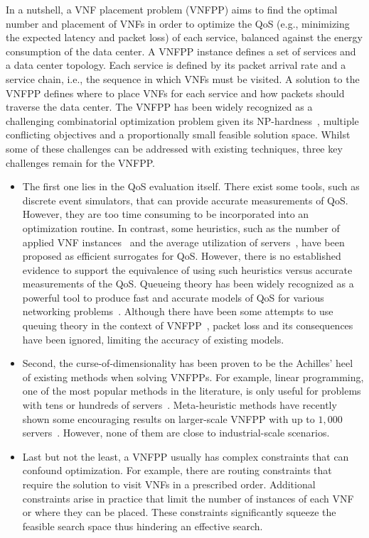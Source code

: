 In a nutshell, a VNF placement problem (VNFPP) aims to find the optimal number and placement of VNFs in order to optimize the QoS (e.g., minimizing the expected latency and packet loss) of each service, balanced against the energy consumption of the data center. A VNFPP instance defines a set of services and a data center topology. Each service is defined by its packet arrival rate and a service chain, i.e., the sequence in which VNFs must be visited. A solution to the VNFPP defines where to place VNFs for each service and how packets should traverse the data center. The VNFPP has been widely recognized as a challenging combinatorial optimization problem given its NP-hardness~\cite{LuizelliCBG17,SangJGDY17,CohenLNR15}, multiple conflicting objectives and a proportionally small feasible solution space. Whilst some of these challenges can be addressed with existing techniques, three key challenges remain for the VNFPP.

\begin{itemize}
    \item The first one lies in the QoS evaluation itself. There exist some tools, such as discrete event simulators, that can provide accurate measurements of QoS. However, they are too time consuming to be incorporated into an optimization routine. In contrast, some heuristics, such as the number of applied VNF instances~\cite{LuizelliCBG17,AddisBBS15} and the average utilization of servers~\cite{JemaaPP16,GaoABS18}, have been proposed as efficient surrogates for QoS. However, there is no established evidence to support the equivalence of using such heuristics versus accurate measurements of the QoS. Queueing theory has been widely recognized as a powerful tool to produce fast and accurate models of QoS for various networking problems~\cite{LakshmiI2013,PapadopoulosC96}. Although there have been some attempts to use queuing theory in the context of VNFPP~\cite{OljiraGTB17,MarottaZDK17,LeivadeasFLIK18,BillingsleyLMMG19}, packet loss and its consequences have been ignored, limiting the accuracy of existing models.
    \item Second, the curse-of-dimensionality has been proven to be the Achilles' heel of existing methods when solving VNFPPs. For example, linear programming, one of the most popular methods in the literature, is only useful for problems with tens or hundreds of servers~\cite{BariCAB15,KawashimaOOM16,AllegKMA17}. Meta-heuristic methods have recently shown some encouraging results on larger-scale VNFPP with up to $1,000$ servers~\cite{LuizelliCBG17}. However, none of them are close to industrial-scale scenarios.
    \item Last but not the least, a VNFPP usually has complex constraints that can confound optimization. For example, there are routing constraints that require the solution to visit VNFs in a prescribed order. Additional constraints arise in practice that limit the number of instances of each VNF or where they can be placed. These constraints significantly squeeze the feasible search space thus hindering an effective search.
\end{itemize}


